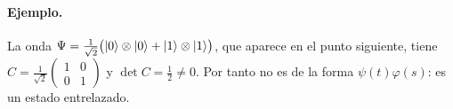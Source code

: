 \paragraph{Ejemplo.} La onda $\Psi=\frac1{\sqrt2}\bigl(\lvert 0\rangle\otimes\lvert 0\rangle+\lvert 1\rangle\otimes\lvert 1\rangle\bigr)$, que aparece en el punto siguiente, tiene $C=\frac1{\sqrt2}\begin{pmatrix}1&0\\0&1\end{pmatrix}$ y $\det C=\frac12\neq0$. Por tanto no es de la forma $\psi(t)\varphi(s)$: es un estado entrelazado.
